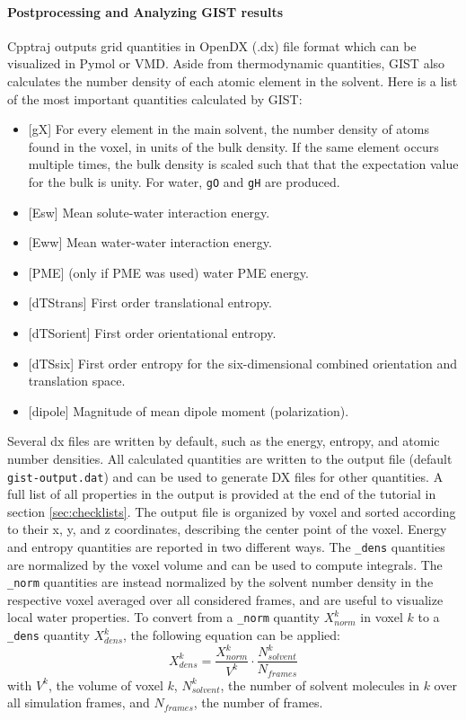 \documentclass[9pt,tutorial]{livecoms}
\newcommand{\code}{\texttt}
\newcommand\inlinecode{\texttt}
\begin{document}
\paragraph{Postprocessing and Analyzing GIST results}
Cpptraj outputs grid quantities in OpenDX (.dx) file format which can be visualized in Pymol or VMD.
Aside from thermodynamic quantities, GIST also calculates the number density of each atomic element in the solvent.
Here is a list of the most important quantities calculated by GIST:

\begin{itemize}
	\item{[gX] For every element in the main solvent, the number density of atoms found in the voxel, in units of the bulk density. If the same element occurs multiple times, the bulk density is scaled such that that the expectation value for the bulk is unity. For water, \code{gO} and \code{gH} are produced.}
	\item{[Esw] Mean solute-water interaction energy.}
	\item{[Eww] Mean water-water interaction energy.}
	\item{[PME] (only if PME was used) water PME energy.}
	\item{[dTStrans] First order translational entropy.}
	\item{[dTSorient] First order orientational entropy.}
	\item{[dTSsix] First order entropy for the six-dimensional combined orientation and translation space.}
	\item{[dipole] Magnitude of mean dipole moment (polarization).}
\end{itemize}

Several dx files are written by default, such as the energy, entropy, and atomic number densities.
All calculated quantities are written to the output file (default \inlinecode{gist-output.dat}) and can be used to generate DX files for other quantities.
A full list of all properties in the output is provided at the end of the tutorial in section \ref{sec:checklists}. 
The output file is organized by voxel and sorted according to their x, y, and z coordinates, describing the center point of the voxel.
Energy and entropy quantities are reported in two different ways.
The \inlinecode{\_dens} quantities are normalized by the voxel volume and can be used to compute integrals.
The \inlinecode{\_norm} quantities are instead normalized by the solvent number density in the respective voxel averaged over all considered frames, and are useful to visualize local water properties.
To convert from a \inlinecode{\_norm} quantity $X^k_{norm}$ in voxel $k$ to a \inlinecode{\_dens} quantity $X^k_{dens}$, the following equation can be applied:
\begin{equation}
	X^k_{dens} = \frac{X^k_{norm}}{V^k} \cdot \frac{N^k_{solvent}}{N_{frames}}
\end{equation}
with $V^k$, the volume of voxel $k$, $N^k_{solvent}$, the number of solvent molecules in $k$ over all simulation frames, and $N_{frames}$, the number of frames.
\end{document}
